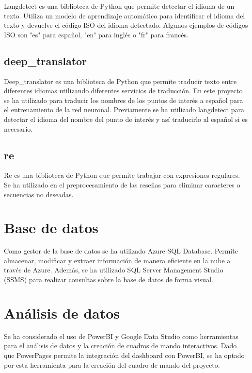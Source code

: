 Langdetect es una biblioteca de Python que permite detectar el idioma de un texto.
Utiliza un modelo de aprendizaje automático para identificar el idioma del texto y devuelve el código ISO del idioma detectado. 
Algunos ejemplos de códigos ISO son "es" para español, "en" para inglés o "fr" para francés.

\subsection{deep\_translator}

Deep\_translator es una biblioteca de Python que permite traducir texto entre diferentes idiomas utilizando diferentes servicios de traducción.
En este proyecto se ha utilizado para traducir los nombres de los puntos de interés a español para el entrenamiento de la red neuronal.
Previamente se ha utilizado langdetect para detectar el idioma del nombre del punto de interés y así traducirlo al español si es necesario.

\subsection{re}

Re es una biblioteca de Python que permite trabajar con expresiones regulares. 
Se ha utilizado en el preprocesamiento de las reseñas para eliminar caracteres o secuencias no deseadas.

\section{Base de datos}

Como gestor de la base de datos se ha utilizado Azure SQL Database. Permite almacenar, modificar y extraer información de manera eficiente en la nube a través de Azure.
Además, se ha utilizado SQL Server Management Studio (SSMS) para realizar consultas sobre la base de datos de forma visual.

\section{Análisis de datos}

Se ha considerado el uso de PowerBI y Google Data Studio como herramientas para el análisis de datos y la creación de cuadros de mando interactivos.
Dado que PowerPages permite la integración del dashboard con PowerBI, se ha optado por esta herramienta para la creación del cuadro de mando del proyecto.

